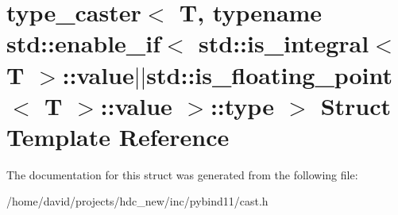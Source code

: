 \hypertarget{structtype__caster_3_01_t_00_01typename_01std_1_1enable__if_3_01std_1_1is__integral_3_01_t_01_4_96732845f2088f27257965608138fc3b}{}\section{type\+\_\+caster$<$ T, typename std\+:\+:enable\+\_\+if$<$ std\+:\+:is\+\_\+integral$<$ T $>$\+:\+:value$\vert$$\vert$std\+:\+:is\+\_\+floating\+\_\+point$<$ T $>$\+:\+:value $>$\+:\+:type $>$ Struct Template Reference}
\label{structtype__caster_3_01_t_00_01typename_01std_1_1enable__if_3_01std_1_1is__integral_3_01_t_01_4_96732845f2088f27257965608138fc3b}


The documentation for this struct was generated from the following file\+:\begin{DoxyCompactItemize}
\item 
/home/david/projects/hdc\+\_\+new/inc/pybind11/cast.\+h\end{DoxyCompactItemize}
